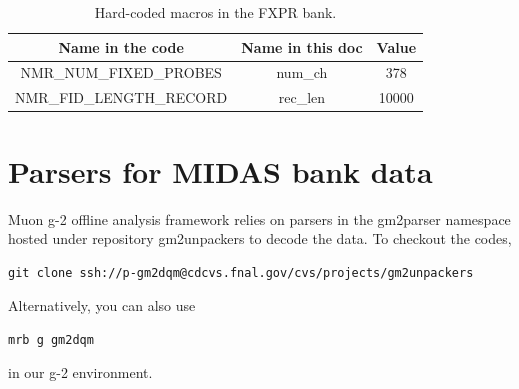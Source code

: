 \begin{table}[htbp]
\centering
\caption{Hard-coded macros in the FXPR bank.}
\begin{tabular}{|c|c|c|}
\hline
Name in the code	& Name in this doc &	Value \\
\hline
NMR\_NUM\_FIXED\_PROBES & num\_ch & 378 \\
\hline
NMR\_FID\_LENGTH\_RECORD & rec\_len & 10000 \\
\hline
\end{tabular} 
\label{tab:fxprmacro}
\end{table}

\section{Parsers for MIDAS bank data}
Muon g-2 offline analysis framework relies on parsers in the gm2parser namespace hosted under repository gm2unpackers to decode the data. To checkout the codes, 

\begin{Verbatim}[frame=single]
git clone ssh://p-gm2dqm@cdcvs.fnal.gov/cvs/projects/gm2unpackers
\end{Verbatim}
%
Alternatively, you can also use 
\begin{Verbatim}[frame=single]
mrb g gm2dqm
\end{Verbatim}
in our g-2 environment.


